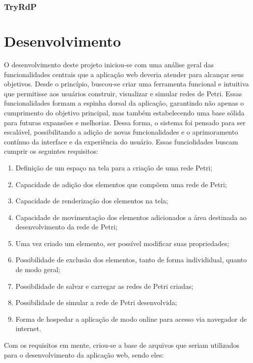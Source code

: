 \documentclass[
	12pt,				%
	openright,			%
	oneside,			%
	a4paper,			%
	english,			%
	brazil				%
	]{abntex2}
\begin{document}
\subsection*{TryRdP}

\chapter{Desenvolvimento} \label{cap:desenvolvimento}

O desenvolvimento deste projeto iniciou-se com uma análise geral das funcionalidades centrais que a aplicação web deveria atender para alcançar seus objetivos. Desde o princípio, buscou-se criar uma ferramenta funcional e intuitiva que permitisse aos usuários construir, visualizar e simular redes de Petri. Essas funcionalidades formam a espinha dorsal da aplicação, garantindo não apenas o cumprimento do objetivo principal, mas também estabelecendo uma base sólida para futuras expansões e melhorias. Dessa forma, o sistema foi pensado para ser escalável, possibilitando a adição de novas funcionalidades e o aprimoramento contínuo da interface e da experiência do usuário. Essas funciolidades buscam cumprir os seguintes requisitos: 

\begin{enumerate}
	\item Definição de um espaço na tela para a criação de uma rede Petri;
	\item Capacidade de adição dos elementos que compõem uma rede de Petri;
	\item Capacidade de renderização dos elementos na tela;
	\item Capacidade de movimentação dos elementos adicionados a área destinada ao desenvolvimento da rede de Petri;
	\item Uma vez criado um elemento, ser possível modificar suas propriedades;
	\item Possibilidade de exclusão dos elementos, tanto de forma individidual, quanto de modo geral;
	\item Possibilidade de salvar e carregar as redes de Petri criadas;
	\item Possibilidade de simular a rede de Petri desenvolvida;
	\item Forma de hospedar a aplicação de modo online para acesso via navegador de internet.
\end{enumerate}

Com os requisitos em mente, criou-se a base de arquivos que seriam utilizados para o desenvolvimento da aplicação web, sendo eles: 
\end{document}
